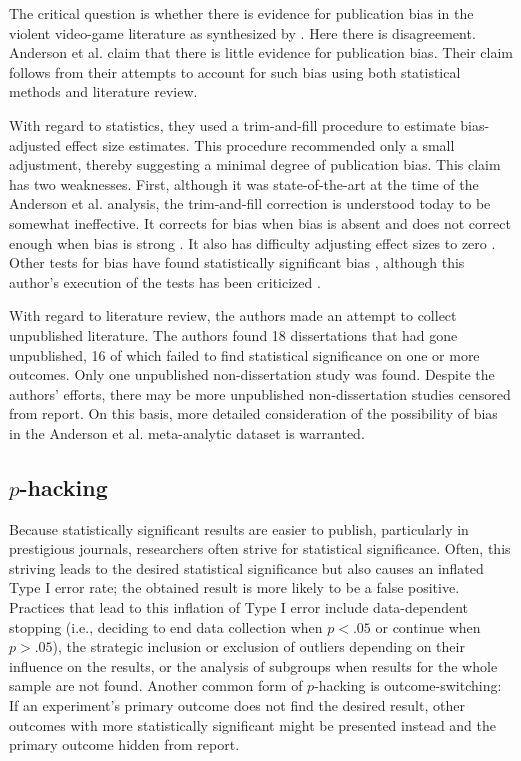 \documentclass[man, mask]{apa6}
\begin{document}
The critical question is whether there is evidence for publication bias in the violent video-game literature as synthesized by \citet{Anderson:etal:2010}.  Here there is disagreement.  Anderson et al. claim that there is little evidence for publication bias.  Their claim follows from their attempts to account for such bias using both statistical methods and literature review.  

With regard to statistics, they used a  trim-and-fill procedure to estimate bias-adjusted effect size estimates. This procedure recommended only a small adjustment, thereby suggesting a minimal degree of publication bias. This claim has two weaknesses. First, although it was state-of-the-art at the time of the Anderson et al. analysis, the trim-and-fill correction is understood today to be somewhat ineffective. It corrects for bias when bias is absent and does not correct enough when bias is strong \citep{Simonsohn:etal:2014b}. It also has difficulty adjusting effect sizes to zero \citep{Moreno:etal:2009}. Other tests for bias have found statistically significant  bias \citep{Ferguson:2007}, although this author's execution of the tests has been criticized \citep[see][]{Anderson:etal:2010}. 

With regard to literature review, the authors made an attempt to collect unpublished literature. The authors found 18 dissertations that had gone unpublished, 16 of which failed to find statistical significance on one or more outcomes. Only one unpublished non-dissertation study was found. Despite the authors' efforts, there may be more unpublished non-dissertation studies censored from report. On this basis, more detailed consideration of the possibility of bias in the Anderson et al. meta-analytic dataset is warranted.

\subsection{$p$-hacking}
Because statistically significant results are easier to publish, particularly in prestigious journals, researchers often strive for statistical significance. Often, this striving leads to the desired statistical significance but also causes an inflated Type I error rate; the obtained result is more likely to be a false positive. Practices that lead to this inflation of Type I error include data-dependent stopping (i.e., deciding to end data collection when $p < .05$ or continue when $p > .05$), the strategic inclusion or exclusion of outliers depending on their influence on the results, or the analysis of subgroups when results for the whole sample are not found. Another common form of $p$-hacking is outcome-switching: If an experiment's primary outcome does not find the desired result, other outcomes with more statistically significant might be presented instead and the primary outcome hidden from report.
\end{document}

